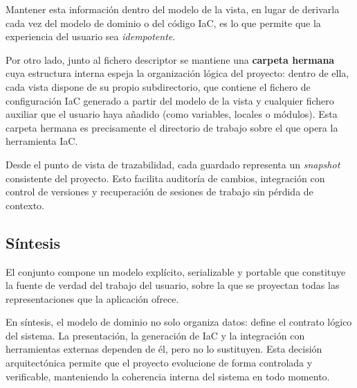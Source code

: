 \documentclass{article}
\begin{document}
{        \justify
        Mantener esta información dentro del modelo de la vista, en
        lugar de derivarla cada vez del modelo de dominio o del código
        IaC, es lo que permite que la experiencia del usuario sea
        \textit{idempotente}.

        \justify
        Por otro lado, junto al fichero descriptor se mantiene una
        \textbf{carpeta hermana} cuya estructura interna espeja la
        organización lógica del proyecto: dentro de ella, cada vista
        dispone de su propio subdirectorio, que contiene el fichero de
        configuración IaC generado a partir del modelo de la vista y
        cualquier fichero auxiliar que el usuario haya añadido (como
        variables, locales o módulos). Esta carpeta hermana es
        precisamente el directorio de trabajo sobre el que opera la
        herramienta IaC.

        \justify
        Desde el punto de vista de trazabilidad, cada guardado representa un \textit{snapshot}
        consistente del proyecto. Esto facilita auditoría de cambios, integración con control
        de versiones y recuperación de sesiones de trabajo sin pérdida de contexto.

        \subsection{Síntesis}
        \justify
        El conjunto compone un modelo
        explícito, serializable y portable que constituye la fuente
        de verdad del trabajo del usuario, sobre la que se proyectan
        todas las representaciones que la aplicación ofrece.

        \justify
        En síntesis, el modelo de dominio no solo organiza datos: define el contrato lógico
        del sistema. La presentación, la generación de IaC y la integración con herramientas
        externas dependen de él, pero no lo sustituyen. Esta decisión arquitectónica permite
        que el proyecto evolucione de forma controlada y verificable, manteniendo la
        coherencia interna del sistema en todo momento.
    }

    
    \newpage
\end{document}
